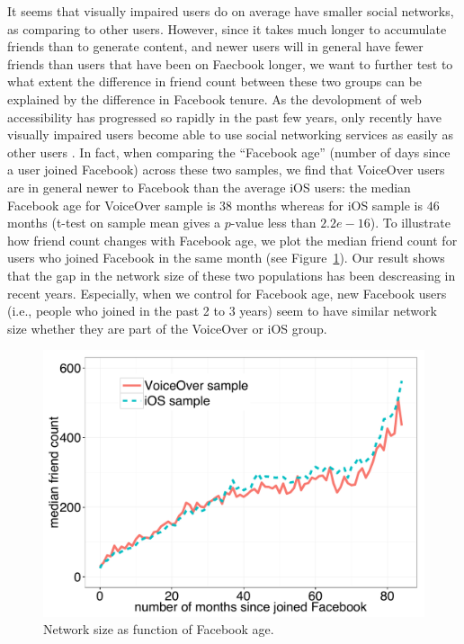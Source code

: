 \documentclass{sigchi}
\begin{document}
It seems that visually impaired users do on average have smaller social networks, as comparing to other users. However, since it takes much longer to accumulate friends than to generate content, and newer users will in general have fewer friends than users that have been on Faecbook longer, we want to further test to what extent the difference in friend count between these two groups can be explained by the difference in Facebook tenure.  As the devolopment of web accessibility has progressed so rapidly in the past few years, only recently have visually impaired users become able to use social networking services as easily as other users \cite{wentz2011}. In fact, when comparing the ``Facebook age'' (number of days since a user joined Facebook) across these two samples, we find that VoiceOver users are in general newer to Facebook than the average iOS users: the median Facebook age for VoiceOver sample is $38$ months whereas for iOS sample is $46$ months (t-test on sample mean gives  a $p$-value less than $2.2e-16$). To illustrate how friend count changes with Facebook age, we plot the median friend count for users who joined Facebook in the same month (see Figure~\ref{fig:friendcount_facebookage}). Our result shows that the gap in the network size of these two populations has been descreasing in recent years. Especially, when we control for Facebook age, new Facebook users (i.e., people who joined in the past 2 to 3 years) seem to have similar network size whether they are part of the VoiceOver or iOS group.

 
\begin{figure}[htb]
\centering
\includegraphics[width=0.9\columnwidth]{friendcount_facebookage.pdf}
\caption{Network size as function of Facebook age.}
\label{fig:friendcount_facebookage}
\end{figure}
\end{document}
